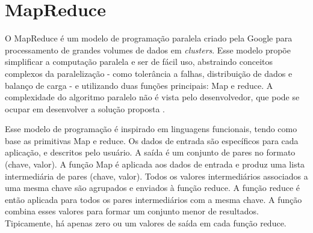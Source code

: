 %
%


\section{MapReduce}
O MapReduce é um modelo de programação paralela criado pela Google para processamento de grandes volumes de dados em \textit{clusters}. Esse modelo propõe simplificar a computação paralela e ser de fácil uso, abstraindo conceitos complexos da paralelização - como tolerância a falhas, distribuição de dados e balanço de carga - e utilizando duas funções principais: Map e reduce. A complexidade do algoritmo paralelo não é vista pelo desenvolvedor, que pode se ocupar em desenvolver a solução proposta \cite{Dean:2008}.

Esse modelo de programação é inspirado em linguagens funcionais, tendo como base as primitivas Map e reduce.
Os dados de entrada são específicos para cada aplicação, e descritos pelo usuário. A saída é um conjunto de pares no formato (chave, valor).
A função Map é aplicada aos dados de entrada e produz uma lista intermediária de pares (chave, valor). Todos os valores intermediários associados a uma mesma chave são agrupados e enviados à função reduce.
A função reduce é então aplicada para todos os pares intermediários com a mesma chave. A função combina esses valores para formar um conjunto menor de resultados.
Tipicamente, há apenas zero ou um valores de saída em cada função reduce.

